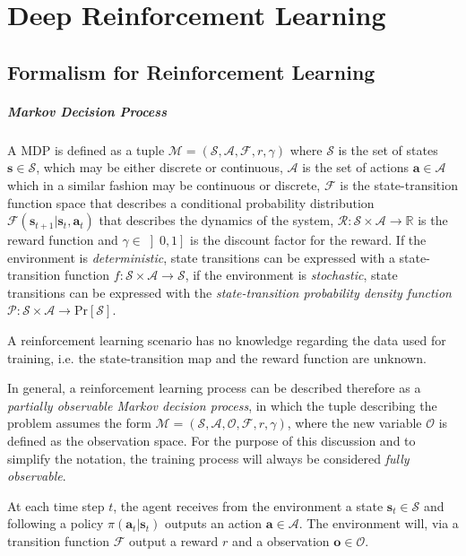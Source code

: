 \chapter{Deep Reinforcement Learning}
\label{chp:back_RLGA}

\section{Formalism for Reinforcement Learning}

\paragraph{Markov Decision Process} A \ac{MDP} is defined as a tuple $\mathcal{M} = (\mathcal{S}, \mathcal{A}, \mathcal{F}, r, \gamma)$ where $\mathcal{S}$ is the set of states $\mathbf{s} \in \mathcal{S}$, which may be either discrete or continuous, $\mathcal{A}$ is the set of actions $\mathbf{a} \in \mathcal{A}$ which in a similar fashion may be continuous or discrete, $\mathcal{F}$ is the state-transition function space that describes a conditional probability distribution $\mathcal{F}(\mathbf{s} _{t+1}|\mathbf{s}_t, \mathbf{a} _t)$ that describes the dynamics of the system, $\mathcal{R} : \mathcal{S} \times \mathcal{A} \rightarrow \mathbb{R}$ is the reward function and $\gamma \in \left]0,1\right]$ is the discount factor for the reward. If the environment is \textit{deterministic}, state transitions can be expressed with a state-transition function $f: \mathcal{S} \times \mathcal{A} \rightarrow \mathcal{S}$, if the environment is \textit{stochastic}, state transitions can be expressed with the \textit{state-transition probability density function} $\mathcal{P}: \mathcal{S} \times \mathcal{A} \rightarrow \mathrm{Pr}[\mathcal{S}]$.

A reinforcement learning scenario has no knowledge regarding the data used for training, i.e. the state-transition map and the reward function are unknown.

In general, a reinforcement learning process can be described therefore as a \textit{partially observable Markov decision process}, in which the tuple describing the problem assumes the form $\mathcal{M} =  (\mathcal{S}, \mathcal{A}, \mathcal{O}, \mathcal{F}, r, \gamma)$, where the new variable $\mathcal{O}$ is defined as the observation space. For the purpose of this discussion and to simplify the notation, the training process will always be considered \textit{fully observable}.

At each time step $t$, the agent receives from the environment a state $\mathbf{s}_t \in \mathcal{S}$ and following a policy $\pi (\mathbf{a}_t | \mathbf{s}_t)$ outputs an action $\mathbf{a} \in \mathcal{A}$. The environment will, via a transition function $\mathcal{F}$ output a reward $r$ and a observation $\mathbf{o} \in \mathcal{O}$.

